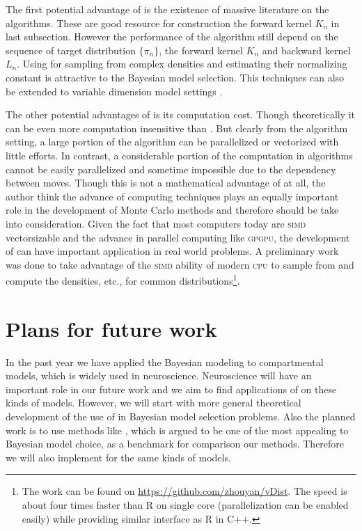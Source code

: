 The first potential advantage of \smc is the existence of massive literature on the \mcmc algorithms. These are
good resource for construction the forward kernel $K_n$ in last subsection. However the performance of the
algorithm still depend on the sequence of target distribution $\{\pi_n\}$, the forward kernel $K_n$ and backward
kernel $L_n$. Using \smc for sampling from complex densities and estimating their normalizing constant is
attractive to the Bayesian model selection. This techniques can also be extended to variable dimension model
settings \parencite{Jasra2008}.

The other potential advantages of \smc is its computation cost. Though theoretically it can be even more
computation insensitive than \mcmc. But clearly from the algorithm setting, a large portion of the algorithm can be
parallelized or vectorized with little efforts. In contrast, a considerable portion of the computation in \mcmc
algorithms cannot be easily parallelized and sometime impossible due to the dependency between moves. Though this
is not a mathematical advantage of \smc at all, the author think the advance of computing techniques plays an
equally important role in the development of Monte Carlo methods and therefore should be take into consideration.
Given the fact that most computers today are \textsc{simd} vectorsizable and the advance in parallel computing like
\textsc{gpgpu}, the development of \smc can have important application in real world problems. A preliminary work
was done to take advantage of the \textsc{simd} ability of modern \textsc{cpu} to sample from and compute the
densities, etc., for common distributions\footnote{The work can be found on
  \url{https://github.com/zhouyan/vDist}.  The speed is about four times faster than \textsf{R} on single core
  (parallelization can be enabled easily) while providing similar interface as \textsf{R} in C++.}.

\section{Plans for future work}
\label{sec:Plans for future work}

In the past year we have applied the Bayesian modeling to compartmental models, which is widely used in
neuroscience. Neuroscience will have an important role in our future work and we aim to find applications of
\smc on these kinds of models. However, we will start with more general theoretical development of the use of \smc
in Bayesian model selection problems. Also the planned work is to use methods like \rjmcmc, which is argued to be
one of the most appealing to Bayesian model choice, as a benchmark for comparison our methods. Therefore we will
also implement \rjmcmc for the same kinds of models.
